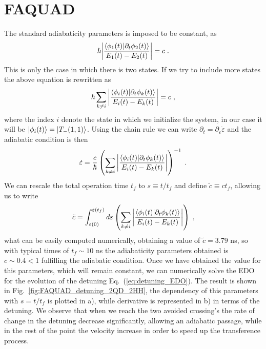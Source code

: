 \documentclass[a4paper,11pt]{article}
\begin{document}
\section{FAQUAD}
The standard adiabaticity parameters is imposed to be constant, as
\begin{equation}
	\hbar\abs{\frac{\braket{\phi_1(t)}{\partial_t\phi_2(t)}}{E_1(t)-E_2(t)}}=c\; .
\end{equation}
This is only the case in which there is two states. If we try to include more states the above equation is rewritten as
\begin{equation}
	\hbar \sum _{k\neq i}\abs{\frac{\braket{\phi_i(t)}{\partial_t\phi_k(t)}}{E_i(t)-E_k(t)}}=c\; ,
\end{equation}
where the index $i$ denote the state in which we initialize the system, in our case it will be $\ket{\phi_i(t)}=\ket{T_-(1,1)}$. Using the chain rule we can write $\partial_t=\partial_\varepsilon \dot{\varepsilon}$ and the adiabatic condition is then
\begin{equation}
	\dot{\varepsilon}=\frac{c}{\hbar}\left(\sum _{k\neq i}\abs{\frac{\braket{\phi_i(t)}{\partial_t\phi_k(t)}}{E_i(t)-E_k(t)}}\right)^{-1}\; .
	\label{eq:detuning_EDO}
\end{equation}
We can rescale the total operation time $t_f$ to $s\equiv t/t_f$ and define $\tilde{c}\equiv ct_f$, allowing us to write
\begin{equation}
	\tilde{c}=\int_{\varepsilon(0)}^{\varepsilon(t_f)}d\varepsilon\left(\sum _{k\neq i}\abs{\frac{\braket{\phi_i(t)}{\partial_t\phi_k(t)}}{E_i(t)-E_k(t)}}\right)\; , 
\end{equation}
what can be easily computed numerically, obtaining a value of $\tilde{c}=3.79$ ns, so with typical times of $t_f\sim 10$ ns the adiabaticity parameters obtained is $c\sim 0.4< 1$ fulfilling the adiabatic condition. Once we have obtained the value for this parameters, which will remain constant, we can numerically solve the EDO for the evolution of the detuning Eq.~(\ref{eq:detuning_EDO}). The result is shown in Fig.~\ref{fig:FAQUAD_detuning_2QD_2HH}, the dependency of this parameters with $s=t/t_f$ is plotted in a), while derivative is represented in b) in terms of the detuning. We observe that when we reach the two avoided crossing's the rate of change in the detuning decrease significantly, allowing an adiabatic passage, while in the rest of the point the velocity increase in order to speed up the transference process.
\end{document}
